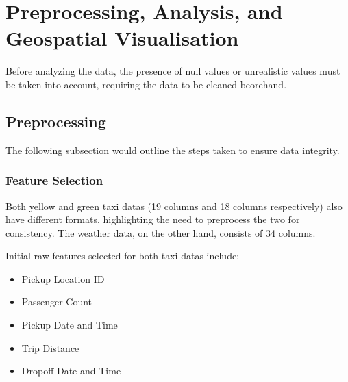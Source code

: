 \documentclass[11pt]{article}
\begin{document}
\section{Preprocessing, Analysis, and Geospatial Visualisation}
Before analyzing the data, the presence of null values or unrealistic values must be taken into account, requiring the data to be cleaned beorehand.

\subsection{Preprocessing}
The following subsection would outline the steps taken to ensure data integrity.
\subsubsection{Feature Selection}
Both yellow and green taxi datas (19 columns and 18 columns respectively) also have different formats, highlighting the need to preprocess the two for consistency. The weather data, on the other hand, consists of 34 columns. 

Initial raw features selected for both taxi datas include:\

\begin{minipage}[t]{0.3\textwidth}
\begin{itemize}
    \item Pickup Location ID
    \item Passenger Count
\end{itemize}
\end{minipage}
\begin{minipage}[t]{0.3\textwidth}
\begin{itemize}
    \item Pickup Date and Time 
    \item Trip Distance
\end{itemize}
\end{minipage}
\begin{minipage}[t]{0.3\textwidth}
\begin{itemize}
    \item Dropoff Date and Time
\end{itemize}
\end{minipage}
\end{document}
